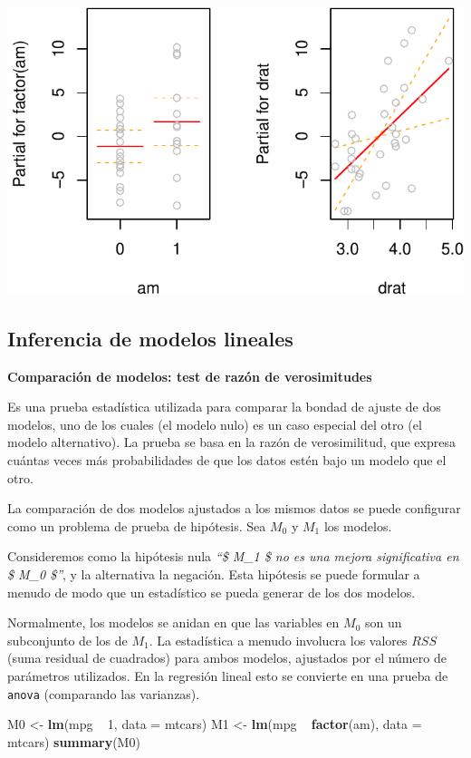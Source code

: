 \documentclass[]{article}
\newenvironment{Shaded}{\begin{snugshade}}{\end{snugshade}}
\newcommand{\KeywordTok}[1]{\textcolor[rgb]{0.13,0.29,0.53}{\textbf{{#1}}}}
\newcommand{\DataTypeTok}[1]{\textcolor[rgb]{0.13,0.29,0.53}{{#1}}}
\newcommand{\DecValTok}[1]{\textcolor[rgb]{0.00,0.00,0.81}{{#1}}}
\newcommand{\StringTok}[1]{\textcolor[rgb]{0.31,0.60,0.02}{{#1}}}
\newcommand{\NormalTok}[1]{{#1}}
\numberwithin{equation}{section}
\begin{document}
\includegraphics{tema6_files/figure-latex/unnamed-chunk-44-2.pdf}

\subsection{Inferencia de modelos
lineales}\label{inferencia-de-modelos-lineales}

\textbf{Comparación de modelos: test de razón de verosimitudes}

Es una prueba estadística utilizada para comparar la bondad de ajuste de
dos modelos, uno de los cuales (el modelo nulo) es un caso especial del
otro (el modelo alternativo). La prueba se basa en la razón de
verosimilitud, que expresa cuántas veces más probabilidades de que los
datos estén bajo un modelo que el otro.

La comparación de dos modelos ajustados a los mismos datos se puede
configurar como un problema de prueba de hipótesis. Sea \(M_0\) y
\(M_1\) los modelos.

Consideremos como la hipótesis nula \emph{``\$ M\_1 \$ no es una mejora
significativa en \$ M\_0 \$''}, y la alternativa la negación. Esta
hipótesis se puede formular a menudo de modo que un estadístico se pueda
generar de los dos modelos.

Normalmente, los modelos se anidan en que las variables en \(M_0\) son
un subconjunto de los de \(M_1\). La estadística a menudo involucra los
valores \(RSS\) (suma residual de cuadrados) para ambos modelos,
ajustados por el número de parámetros utilizados. En la regresión lineal
esto se convierte en una prueba de \texttt{anova} (comparando las
varianzas).

\begin{Shaded}
\begin{Highlighting}[]
\NormalTok{M0 <-}\StringTok{ }\KeywordTok{lm}\NormalTok{(mpg ~}\StringTok{ }\DecValTok{1}\NormalTok{, }\DataTypeTok{data =} \NormalTok{mtcars)}
\NormalTok{M1 <-}\StringTok{ }\KeywordTok{lm}\NormalTok{(mpg ~}\StringTok{ }\KeywordTok{factor}\NormalTok{(am), }\DataTypeTok{data =} \NormalTok{mtcars)}
\KeywordTok{summary}\NormalTok{(M0)}
\end{Highlighting}
\end{Shaded}
\end{document}
